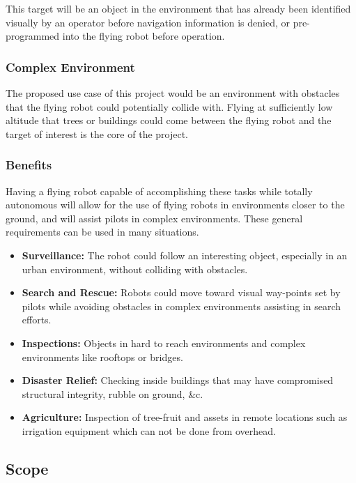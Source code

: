 \documentclass{article}
\begin{document}
		This target will be an object in the environment that has already been identified visually by an operator before navigation information is denied, or pre-programmed into the flying robot before operation.
		
		\subsubsection{Complex Environment}
		
		The proposed use case of this project would be an environment with obstacles that the flying robot could potentially collide with. Flying at sufficiently low altitude that trees or buildings could come between the flying robot and the target of interest is the core of the project.
		
		\subsubsection{Benefits}
		
		Having a flying robot capable of accomplishing these tasks while totally autonomous will allow for the use of flying robots in environments closer to the ground, and will assist pilots in complex environments. These general requirements can be used in many situations.
		
		\begin{itemize}
			\item \textbf{Surveillance:} The robot could follow an interesting object, especially in an urban environment, without colliding with obstacles.
			\item \textbf{Search and Rescue:} Robots could move toward visual way-points set by pilots while avoiding obstacles in complex environments assisting in search efforts.
			\item \textbf{Inspections:} Objects in hard to reach environments and complex environments like rooftops or bridges.
			\item \textbf{Disaster Relief:} Checking inside buildings that may have compromised structural integrity, rubble on ground, \&c.
			\item \textbf{Agriculture:} Inspection of tree-fruit and assets in remote locations such as irrigation equipment which can not be done from overhead.
		\end{itemize}
		
	\subsection{Scope}
	
\end{document}
